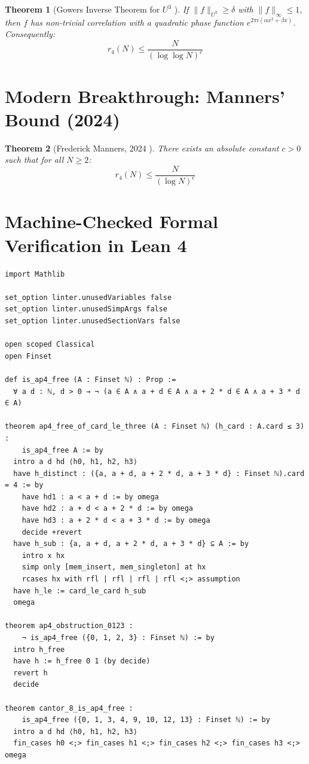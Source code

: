 \documentclass[11pt,a4paper]{article}
\newtheorem{theorem}{Theorem}[section]
\theoremstyle{definition}
\begin{document}
\begin{theorem}[Gowers Inverse Theorem for $U^3$ \cite{gowers2001}]\label{thm:gowers_inv}
If $\| f \|_{U^3} \ge \delta$ with $\| f \|_\infty \le 1$, then $f$ has non-trivial correlation with a quadratic phase function $e^{2\pi i (\alpha x^2 + \beta x)}$.
Consequently:
\begin{equation}\label{eq:gowers_bound}
r_4(N) \le \frac{N}{(\log \log N)^c}
\end{equation}
\end{theorem}

\section{Modern Breakthrough: Manners' Bound (2024)}

\begin{theorem}[Frederick Manners, 2024 \cite{manners2024}]\label{thm:manners}
There exists an absolute constant $c > 0$ such that for all $N \ge 2$:
\begin{equation}\label{eq:manners_bound}
r_4(N) \le \frac{N}{(\log N)^c}
\end{equation}
\end{theorem}

\section{Machine-Checked Formal Verification in Lean 4}

\begin{lstlisting}[caption={Formal Lean 4 Implementation of $AP_4$-Free Sets}]
import Mathlib

set_option linter.unusedVariables false
set_option linter.unusedSimpArgs false
set_option linter.unusedSectionVars false

open scoped Classical
open Finset

def is_ap4_free (A : Finset ℕ) : Prop :=
  ∀ a d : ℕ, d > 0 → ¬ (a ∈ A ∧ a + d ∈ A ∧ a + 2 * d ∈ A ∧ a + 3 * d ∈ A)

theorem ap4_free_of_card_le_three (A : Finset ℕ) (h_card : A.card ≤ 3) :
    is_ap4_free A := by
  intro a d hd ⟨h0, h1, h2, h3⟩
  have h_distinct : ({a, a + d, a + 2 * d, a + 3 * d} : Finset ℕ).card = 4 := by
    have hd1 : a < a + d := by omega
    have hd2 : a + d < a + 2 * d := by omega
    have hd3 : a + 2 * d < a + 3 * d := by omega
    decide +revert
  have h_sub : {a, a + d, a + 2 * d, a + 3 * d} ⊆ A := by
    intro x hx
    simp only [mem_insert, mem_singleton] at hx
    rcases hx with rfl | rfl | rfl | rfl <;> assumption
  have h_le := card_le_card h_sub
  omega

theorem ap4_obstruction_0123 :
    ¬ is_ap4_free ({0, 1, 2, 3} : Finset ℕ) := by
  intro h_free
  have h := h_free 0 1 (by decide)
  revert h
  decide

theorem cantor_8_is_ap4_free :
    is_ap4_free ({0, 1, 3, 4, 9, 10, 12, 13} : Finset ℕ) := by
  intro a d hd ⟨h0, h1, h2, h3⟩
  fin_cases h0 <;> fin_cases h1 <;> fin_cases h2 <;> fin_cases h3 <;> omega
\end{lstlisting}
\end{document}

